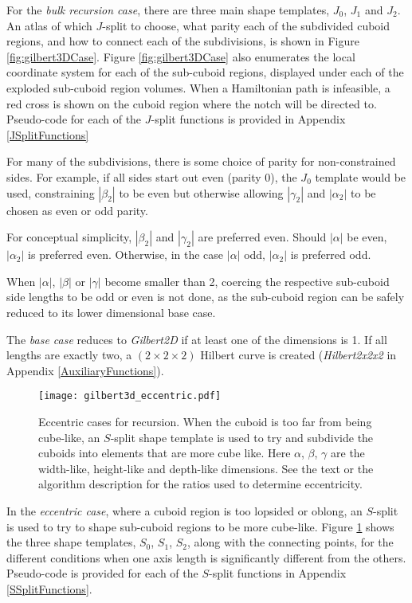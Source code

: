 For the \textit{bulk recursion case}, there are three main shape templates, $J_0$, $J_1$ and $J_2$.
An atlas of which $J$-split to choose, what parity each of the subdivided cuboid regions, and how
to connect each of the subdivisions, is shown in Figure \ref{fig:gilbert3DCase}.
Figure \ref{fig:gilbert3DCase} also enumerates the local coordinate system for each of the sub-cuboid
regions, displayed under each of the exploded sub-cuboid region volumes.
When a Hamiltonian path is infeasible,
a red cross is shown on the cuboid region where the notch will be directed to.
Pseudo-code for each of the $J$-split functions is provided in Appendix \ref{JSplitFunctions}

For many of the subdivisions, there is some choice of parity for non-constrained sides.
For example, if all sides start out even (parity $0$), the $J_0$ template would be used, constraining
$|\beta_2|$ to be even but otherwise allowing $|\gamma_2|$ and $|\alpha_2|$ to be chosen as even or odd parity.

For conceptual simplicity, $|\beta_2|$ and $|\gamma_2|$ are preferred even.
Should $|\alpha|$ be even, $|\alpha_2|$ is preferred even.
Otherwise, in the case $|\alpha|$ odd, $|\alpha_2|$ is preferred odd.

When $|\alpha|$, $|\beta|$ or $|\gamma|$ become smaller than 2, coercing the respective sub-cuboid
side lengths to be odd or even is not done, as the sub-cuboid region can be safely reduced to its
lower dimensional base case.

The \textit{base case} reduces to \textit{Gilbert2D} if at least one of the dimensions is 1.
If all lengths are exactly two, a $(2 \times 2 \times 2)$ Hilbert curve is created
(\textit{Hilbert2x2x2} in Appendix \ref{AuxiliaryFunctions}).

\begin{figure}[h]
  \centering
  \texttt{[image: gilbert3d\_eccentric.pdf]}
  \caption{ Eccentric cases for recursion. When the cuboid is too far from being cube-like, an $S$-split shape template is used to try and subdivide the cuboids into elements that are more cube like. Here $\alpha$, $\beta$, $\gamma$ are the width-like, height-like and depth-like dimensions. See the text or the algorithm description for the ratios used to determine eccentricity. }
  \label{fig:gilbert3DEccentricCase}
\end{figure}

In the \textit{eccentric case}, where a cuboid region is too lopsided or oblong, an $S$-split is used to try to shape
sub-cuboid regions to be more cube-like.
Figure \ref{fig:gilbert3DEccentricCase} shows the three shape templates, $S_0$, $S_1$, $S_2$, along with the connecting
points, for the different conditions when one axis length is significantly different from the others.
Pseudo-code is provided for each of the $S$-split functions in Appendix \ref{SSplitFunctions}.

